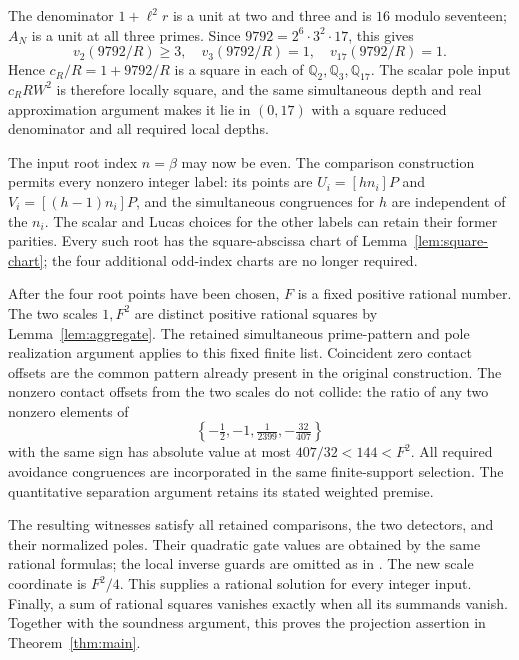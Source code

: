 \documentclass[11pt,a4paper]{article}
\theoremstyle{remark}\newtheorem{remark}[theorem]{Remark}
\newcommand{\Q}{\mathbb Q}\newcommand{\Z}{\mathbb Z}
\begin{document}
The denominator $1+\ell^2r$ is a unit at two and three and is
$16$ modulo seventeen; $A_N$ is a unit at all three primes.
Since $9792=2^6\cdot3^2\cdot17$, this gives
\[
 v_2(9792/R)\ge3,\quad v_3(9792/R)=1,
 \quad v_{17}(9792/R)=1.
\]
Hence $c_R/R=1+9792/R$ is a square in each of
$\Q_2,\Q_3,\Q_{17}$. The scalar pole input $c_RRW^2$ is
therefore locally square, and the same simultaneous depth and
real approximation argument makes it lie in $(0,17)$ with a
square reduced denominator and all required local depths.

The input root index $n=\beta$ may now be even. The comparison
construction permits every nonzero integer label: its points
are $U_i=[hn_i]P$ and $V_i=[(h-1)n_i]P$, and the simultaneous
congruences for $h$ are independent of the $n_i$. The scalar
and Lucas choices for the other labels can retain their former
parities. Every such root has the square-abscissa chart of
Lemma~\ref{lem:square-chart}; the four additional odd-index
charts are no longer required.

After the four root points have been chosen, $F$ is a fixed
positive rational number. The two scales $1,F^2$ are distinct
positive rational squares by Lemma~\ref{lem:aggregate}.
The retained simultaneous prime-pattern and pole realization
argument applies to this fixed finite list. Coincident zero contact
offsets are the common pattern already present in the original
construction. The nonzero contact offsets from the two scales do
not collide: the ratio of any two nonzero elements of
\[
 \left\{-\tfrac12,-1,\tfrac1{2399},-\tfrac{32}{407}\right\}
\]
with the same sign has absolute value at most $407/32<144<F^2$.
All required avoidance congruences are incorporated in the same
finite-support selection. The quantitative separation argument
retains its stated weighted premise.

The resulting witnesses satisfy all retained comparisons, the two
detectors, and their normalized poles. Their quadratic gate values
are obtained by the same rational formulas; the local inverse
guards are omitted as in \cite{Quartic389}. The new scale coordinate
is $F^2/4$. This supplies a rational solution for every integer
input. Finally, a sum of rational squares vanishes exactly when
all its summands vanish. Together with the soundness argument,
this proves the projection assertion in Theorem~\ref{thm:main}.
\end{document}
